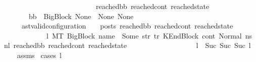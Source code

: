 \begin{isabellebody}
\ \ \ \ \ \ \ \ \ \ \ \ \ \ \ \ \ \ \ \ \ \ \ \ \ \ {\isacharparenleft}{\kern0pt}reached{\isacharunderscore}{\kern0pt}bb{\isacharcomma}{\kern0pt}\ reached{\isacharunderscore}{\kern0pt}cont{\isacharcomma}{\kern0pt}\ reached{\isacharunderscore}{\kern0pt}state{\isacharparenright}{\kern0pt}{\isachardoublequoteclose}\isanewline
\ \ \ \ \ \ \ {\isachardoublequoteopen}bb{}\ {\isacharequal}{\kern0pt}\ BigBlock\ None\ {\isacharbrackleft}{\kern0pt}{\isacharbrackright}{\kern0pt}\ None\ None{\isachardoublequoteclose}\isanewline
\ \ \ \ \ {\isachardoublequoteopen}{\isacharparenleft}{\kern0pt}ast{\isacharunderscore}{\kern0pt}valid{\isacharunderscore}{\kern0pt}configuration\ {\isasymLambda}\ {\isasymGamma}\ {\isasymOmega}\ posts\ reached{\isacharunderscore}{\kern0pt}bb\ reached{\isacharunderscore}{\kern0pt}cont\ reached{\isacharunderscore}{\kern0pt}state{\isacharparenright}{\kern0pt}\ {\isasymor}\ \isanewline
\ \ \ \ \ \ \ \ \ \ \ {\isacharparenleft}{\kern0pt}{\isasymexists}\ l{}{\isachardot}{\kern0pt}\ {\isacharparenleft}{\kern0pt}M{\isacharcomma}{\kern0pt}{\isasymLambda}{\isacharcomma}{\kern0pt}{\isasymGamma}{\isacharcomma}{\kern0pt}{\isasymOmega}{\isacharcomma}{\kern0pt}T\ {\isasymturnstile}{\isacharparenleft}{\kern0pt}{\isacharparenleft}{\kern0pt}BigBlock\ name\ {\isacharbrackleft}{\kern0pt}{\isacharbrackright}{\kern0pt}\ {\isacharparenleft}{\kern0pt}Some\ str{\isacharparenright}{\kern0pt}\ tr{\isacharparenright}{\kern0pt}{\isacharcomma}{\kern0pt}\ KEndBlock\ cont{}{\isacharcomma}{\kern0pt}\ Normal\ ns{}{\isacharparenright}{\kern0pt}\ {\isacharminus}{\kern0pt}n{\isasymlongrightarrow}{\isacharcircum}{\kern0pt}l{}\ {\isacharparenleft}{\kern0pt}reached{\isacharunderscore}{\kern0pt}bb{\isacharcomma}{\kern0pt}\ reached{\isacharunderscore}{\kern0pt}cont{\isacharcomma}{\kern0pt}\ reached{\isacharunderscore}{\kern0pt}state{\isacharparenright}{\kern0pt}{\isacharparenright}{\kern0pt}\ {\isasymand}\isanewline
\ \ \ \ \ \ \ \ \ \ \ \ \ \ \ \ \ \ l\ {\isacharequal}{\kern0pt}\ Suc\ {\isacharparenleft}{\kern0pt}Suc\ {\isacharparenleft}{\kern0pt}Suc\ l{}{\isacharparenright}{\kern0pt}{\isacharparenright}{\kern0pt}\ {\isacharparenright}{\kern0pt}{\isachardoublequoteclose}\isanewline
%
\isadelimproof
\ \ %
\endisadelimproof
%
\isatagproof
{}\isamarkupfalse%
\ assms\isanewline
{}\isamarkupfalse%
\ {\isacharparenleft}{\kern0pt}cases\ l{\isacharparenright}{\kern0pt}\isanewline
\ \ \isamarkupfalse%
\ {}\isanewline

\end{isabellebody}
